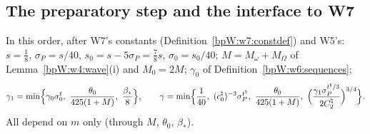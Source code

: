 \subsection{The preparatory step and the interface to W7}\label{bpW:w6:prep-sec}

\begin{definition}[W6 constants]\label{bpW:w6:constants}
In this order, after W7's constants (Definition~\ref{bpW:w7:constdef}) and W5's: $s=\frac18$, $\sigma_P=s/40$,
$s_0=s-5\sigma_P=\frac78s$, $\sigma_0=s_0/40$; $M=M_\omega+M_\Omega$ of Lemma~\ref{bpW:w4:wave}(i) and $M_0=2M$; $\gamma_0$ of
Definition~\ref{bpW:w6:sequences};
\[\gamma_1=\min\Bigl\{\gamma_0\sigma_0^t,\ \frac{\theta_0}{425(1+M)},\ \frac{\beta_*}{8}\Bigr\},\qquad
\gamma=\min\Bigl\{\frac1{40},\ (c^\natural_0)^{-3}\sigma_P^{t^\natural},\ \frac{\theta_0}{425(1+M)},\ \Bigl(\frac{\gamma_1\sigma_P^{t^\natural/3}}{2C^\natural_2}\Bigr)^{3/4}\Bigr\}.\]
All depend on $m$ only (through $M$, $\theta_0$, $\beta_*$).
\end{definition}


